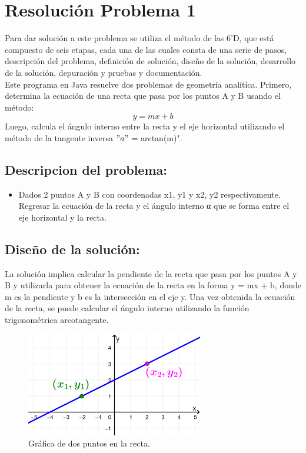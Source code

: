 \section{Resolución Problema 1} 
Para dar solución a este problema se utiliza  el método de las 6’D, que está compuesto de seis etapas, cada una de las cuales consta de una serie de pasos, descripción del
problema, definición de solución, diseño de la solución,
desarrollo de la solución, depuración y pruebas y
documentación. \\



Este programa en Java resuelve dos problemas de geometría analítica. Primero, determina la ecuación de una recta que pasa por los puntos A y B usando el método:
\[
\text{ $y = mx + b$ }
\]
 Luego, calcula el ángulo interno entre la recta y el eje horizontal utilizando el método de la tangente inversa  $"a "$ = arctan(m)".
\subsection{\textbf{Descripcion del problema:}}
\begin{itemize}

    \item Dados 2 puntos A y B con coordenadas x1, y1 y x2, y2 respectivamente. Regresar la ecuación de la recta y el ángulo interno α que se forma entre el eje horizontal y la recta.
    \end{itemize}
\subsection{\textbf{Diseño de la solución:}}
La solución implica calcular la pendiente de la recta que pasa por los puntos A y B y utilizarla para obtener la ecuación de la recta en la forma y = mx + b, donde m es la pendiente y b es la intersección en el eje y. Una vez obtenida la ecuación de la recta, se puede calcular el ángulo interno utilizando la función trigonométrica arcotangente.
\begin{figure}[h!]
    \centering
    \includegraphics[width = 6.5 cm]{LaTeX/latex-imagenes/grafica-rectapendiente.png}
    \caption{Gráfica de dos puntos en la recta.}
    \label{fig:GraficaEcuacionRecta}
\end{figure} 
